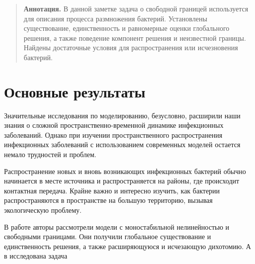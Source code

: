 
\maketitle

\begin{abstract}
\textbf{Аннотация.} В данной заметке задача о свободной границей используется для описания процесса размножения бактерий. Установлены существование, единственность и равномерные оценки глобального решения, а также поведение компонент решения и неизвестной границы. Найдены достаточные условия для распространения или исчезновения бактерий.

\end{abstract}

\section{Основные результаты} %

Значительные исследования по моделированию, безусловно, расширили наши знания о сложной пространственно-временной динамике инфекционных заболеваний. Однако при изучении пространственного распространения инфекционных заболеваний с использованием современных моделей остается немало трудностей и проблем.

Распространение новых и вновь возникающих инфекционных бактерий обычно начинается в месте источника и распространяется на районы, где происходит контактная передача. Крайне важно и интересно изучить, как бактерии распространяются в пространстве на большую территорию, вызывая экологическую проблему.

В работе \cite{Ahn} авторы рассмотрели модели с моностабильной нелинейностью и свободными границами. Они получили глобальное существование и единственность решения, а также расширяющуюся и исчезающую дихотомию. А в \cite{Zhao} исследована задача

